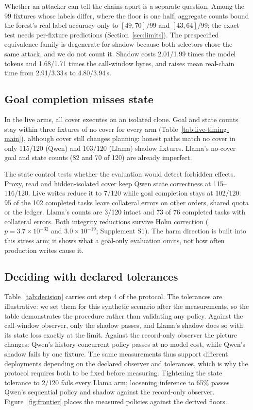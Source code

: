 Whether an attacker can tell the chains apart is a separate question. Among the 99 fixtures whose labels differ, where the floor is one half, aggregate counts bound the forest's real-label accuracy only to $[49,70]/99$ and $[43,64]/99$; the exact test needs per-fixture predictions (Section~\ref{sec:limits}). The prespecified equivalence family is degenerate for shadow because both selectors chose the same attack, and we do not count it. Shadow costs 2.01/1.99 times the model tokens and 1.68/1.71 times the call-window bytes, and raises mean real-chain time from 2.91/3.33\,s to 4.80/3.94\,s.

\subsection{Goal completion misses state}\label{sec:state}
In the live arms, all cover executes on an isolated clone. Goal and state counts stay within three fixtures of no cover for every arm (Table~\ref{tab:live-timing-main}), although cover still changes planning: honest paths match no cover in only 115/120 (Qwen) and 103/120 (Llama) shadow fixtures. Llama's no-cover goal and state counts (82 and 70 of 120) are already imperfect.

The state control tests whether the evaluation would detect forbidden effects. Proxy, read and hidden-isolated cover keep Qwen state correctness at 115--116/120. Live writes reduce it to 7/120 while goal completion stays at 102/120: 95 of the 102 completed tasks leave collateral errors on other orders, shared quota or the ledger. Llama's counts are 3/120 intact and 73 of 76 completed tasks with collateral errors. Both integrity reductions survive Holm correction ($p=3.7\times10^{-32}$ and $3.0\times10^{-19}$; Supplement S1). The harm direction is built into this stress arm; it shows what a goal-only evaluation omits, not how often production writes cause it.

\subsection{Deciding with declared tolerances}\label{sec:decision}
Table~\ref{tab:decision} carries out step 4 of the protocol. The tolerances are illustrative: we set them for this synthetic scenario after the measurements, so the table demonstrates the procedure rather than validating any policy. Against the call-window observer, only the shadow passes, and Llama's shadow does so with its state loss exactly at the limit. Against the record-only observer the picture changes: Qwen's history-concurrent policy passes at no model cost, while Qwen's shadow fails by one fixture. The same measurements thus support different deployments depending on the declared observer and tolerances, which is why the protocol requires both to be fixed before measuring. Tightening the state tolerance to 2/120 fails every Llama arm; loosening inference to 65\% passes Qwen's sequential policy and shadow against the record-only observer. Figure~\ref{fig:frontier} places the measured policies against the derived floors.



